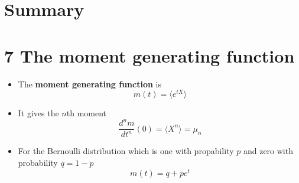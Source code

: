 
\ifind
\section*{Summary}
\else
\section*{7 The moment generating function}
\fi


\begin{itemize}
\item The \textbf{moment generating function} is
  \begin{equation}
    m(t)=\langle e^{tX}\rangle
  \end{equation}
\item It gives the $n$th moment
  \begin{equation}
\frac{d^nm}{dt^n}(0)=\langle X^n\rangle=\mu_n
\end{equation}
\item For the Bernoulli distribution which is one with propability $p$ and zero with probability $q=1-p$
  \begin{equation}
    m(t)=q+pe^t
  \end{equation}
  \end{itemize}
